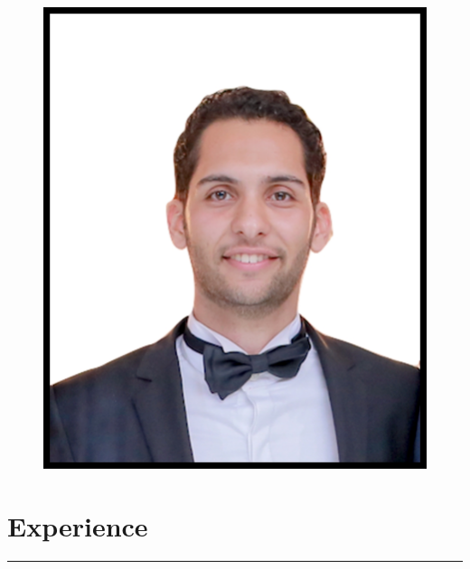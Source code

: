 \documentclass[a4paper,13pt]{article}
\begin{document}
\begin{adjustwidth}{-3cm}{}
\begin{figure}[h]
	\vspace{-3cm} \hspace{13cm} \includegraphics[scale=0.055]{me.jpg}	
	
\end{figure}








\section{Experience}
\rule[0pt]{20cm}{0.5pt}

\begin{tabular}{r|p{17.5cm}}
		

\end{tabular}
\end{adjustwidth}
\end{document}
